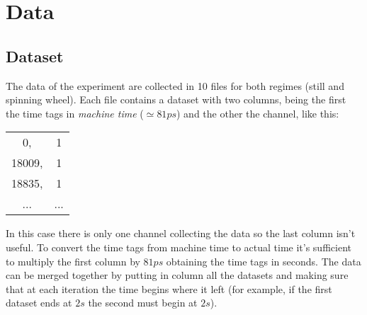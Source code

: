 
\section{Data}
\subsection{Dataset}
The data of the experiment are collected in 10 files for both regimes (still and spinning wheel). Each file contains a dataset with two columns, being the first the time tags in \emph{machine time} ($\simeq 81ps$) and the other the channel, like this:\\
\begin{center}
\begin{tabular}{c c}
0, & 1 \\
18009, & 1 \\
18835, & 1 \\
...  & ...
\end{tabular}
\end{center}
In this case there is only one channel collecting the data so the last column isn't useful. To convert the time tags from machine time to actual time it's sufficient to multiply the first column by $81ps$ obtaining the time tags in seconds. The data can be merged together by putting in column all the datasets and making sure that at each iteration the time begins where it left (for example, if the first dataset ends at $2s$ the second must begin at $2s$).